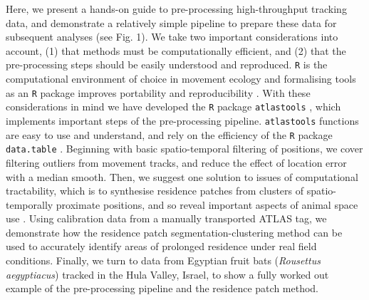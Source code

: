 \documentclass[10pt,paper=a4,headings=standardclasses
]{scrartcl}
\begin{document}
Here, we present a hands-on guide to pre-processing high-throughput tracking data, and demonstrate a relatively simple pipeline to prepare these data for subsequent analyses (see Fig. 1). 
We take two important considerations into account, (1) that methods must be computationally efficient, and (2) that the pre-processing steps should be easily understood and reproduced.
\texttt{R} is the computational environment of choice in movement ecology \citep{joo2020} and formalising tools as an \texttt{R} package improves portability and reproducibility \citep{marwick2018}.
With these considerations in mind we have developed the \texttt{R} package \texttt{atlastools} \citep{gupte2020a, rcoreteam2020}, which implements important steps of the pre-processing pipeline.
\texttt{atlastools} functions are easy to use and understand, and rely on the efficiency of the \texttt{R} package \texttt{data.table} \citep{dowle2020}.
Beginning with basic spatio-temporal filtering of positions, we cover filtering outliers from movement tracks, and reduce the effect of location error with a median smooth.
Then, we suggest one solution to issues of computational tractability, which is to synthesise residence patches from clusters of spatio-temporally proximate positions, and so reveal important aspects of animal space use \citep[\textit{sensu}][]{bijleveld2016, oudman2018, barraquand2008}.
Using calibration data from a manually transported ATLAS tag, we demonstrate how the residence patch segmentation-clustering method can be used to accurately identify areas of prolonged residence under real field conditions.
Finally, we turn to data from Egyptian fruit bats (\textit{Rousettus aegyptiacus}) tracked in the Hula Valley, Israel, to show a fully worked out example of the pre-processing pipeline and the residence patch method.
\end{document}

